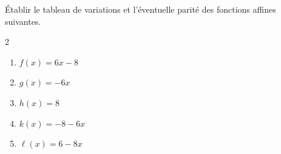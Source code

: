\begin{exo}{}
	Établir le tableau de variations et l'éventuelle parité des fonctions affines suivantes.
	\vspace*{-2mm}
	\begin{multicols}{2}
	\begin{enumerate}
		\item $f(x) = 6x - 8$
		\item $g(x) = -6x$
		\item $h(x) = 8$
		\item $k(x) = -8 - 6x$
		\item $\ell(x) = 6 - 8x$
	\end{enumerate}
	\end{multicols}
\end{exo}
